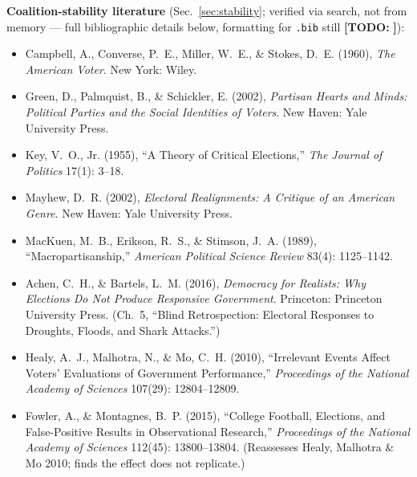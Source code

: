 \documentclass[11pt]{article}
\newcommand{\todo}[1]{{\color{red}\textbf{[TODO:} #1\textbf{]}}}
\begin{document}
\textbf{Coalition-stability literature} (Sec.~\ref{sec:stability}; verified via
search, not from memory --- full bibliographic details below, formatting for
\texttt{.bib} still \todo{}):
\begin{itemize}
  \item Campbell, A., Converse, P.\ E., Miller, W.\ E., \& Stokes, D.\ E.
        (1960), \emph{The American Voter}. New York: Wiley.
  \item Green, D., Palmquist, B., \& Schickler, E. (2002), \emph{Partisan
        Hearts and Minds: Political Parties and the Social Identities of
        Voters}. New Haven: Yale University Press.
  \item Key, V.\ O., Jr. (1955), ``A Theory of Critical Elections,''
        \emph{The Journal of Politics} 17(1): 3--18.
  \item Mayhew, D.\ R. (2002), \emph{Electoral Realignments: A Critique of
        an American Genre}. New Haven: Yale University Press.
  \item MacKuen, M.\ B., Erikson, R.\ S., \& Stimson, J.\ A. (1989),
        ``Macropartisanship,'' \emph{American Political Science Review}
        83(4): 1125--1142.
  \item Achen, C.\ H., \& Bartels, L.\ M. (2016), \emph{Democracy for
        Realists: Why Elections Do Not Produce Responsive Government}.
        Princeton: Princeton University Press. (Ch.~5, ``Blind
        Retrospection: Electoral Responses to Droughts, Floods, and Shark
        Attacks.'')
  \item Healy, A.\ J., Malhotra, N., \& Mo, C.\ H. (2010), ``Irrelevant
        Events Affect Voters' Evaluations of Government Performance,''
        \emph{Proceedings of the National Academy of Sciences} 107(29):
        12804--12809.
  \item Fowler, A., \& Montagnes, B.\ P. (2015), ``College Football,
        Elections, and False-Positive Results in Observational Research,''
        \emph{Proceedings of the National Academy of Sciences} 112(45):
        13800--13804. (Reassesses Healy, Malhotra \& Mo 2010; finds the
        effect does not replicate.)
\end{itemize}
\end{document}
